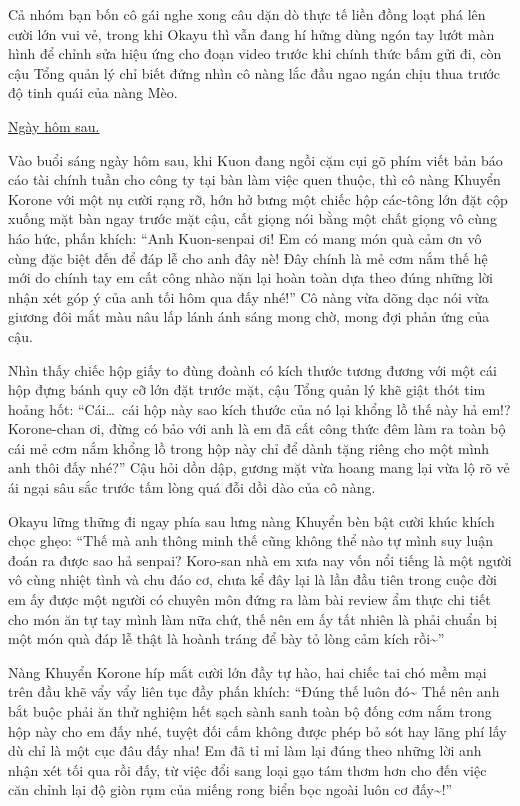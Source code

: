 \documentclass[../main.tex]{subfiles}
\begin{document}
Cả nhóm bạn bốn cô gái nghe xong câu dặn dò thực tế liền đồng loạt phá lên cười lớn vui vẻ, trong khi Okayu thì vẫn đang hí hửng dùng ngón tay lướt màn hình để chỉnh sửa hiệu ứng cho đoạn video trước khi chính thức bấm gửi đi, còn cậu Tổng quản lý chỉ biết đứng nhìn cô nàng lắc đầu ngao ngán chịu thua trước độ tinh quái của nàng Mèo.

\ct

\begin{center}
  \uline{Ngày hôm sau.}
\end{center}

Vào buổi sáng ngày hôm sau, khi Kuon đang ngồi cặm cụi gõ phím viết bản báo cáo tài chính tuần cho công ty tại bàn làm việc quen thuộc, thì cô nàng Khuyển Korone với một nụ cười rạng rỡ, hớn hở bưng một chiếc hộp các-tông lớn đặt cộp xuống mặt bàn ngay trước mặt cậu, cất giọng nói bằng một chất giọng vô cùng háo hức, phấn khích: ``Anh Kuon-senpai ơi! Em có mang món quà cảm ơn vô cùng đặc biệt đến để đáp lễ cho anh đây nè! Đây chính là mẻ cơm nắm thế hệ mới do chính tay em cất công nhào nặn lại hoàn toàn dựa theo đúng những lời nhận xét góp ý của anh tối hôm qua đấy nhé!'' Cô nàng vừa dõng dạc nói vừa giương đôi mắt màu nâu lấp lánh ánh sáng mong chờ, mong đợi phản ứng của cậu.

Nhìn thấy chiếc hộp giấy to đùng đoành có kích thước tương đương với một cái hộp đựng bánh quy cỡ lớn đặt trước mặt, cậu Tổng quản lý khẽ giật thót tim hoảng hốt: ``Cái\dots\ cái hộp này sao kích thước của nó lại khổng lồ thế này hả em!? Korone-chan ơi, đừng có bảo với anh là em đã cất công thức đêm làm ra toàn bộ cái mẻ cơm nắm khổng lồ trong hộp này chỉ để dành tặng riêng cho một mình anh thôi đấy nhé?'' Cậu hỏi dồn dập, gương mặt vừa hoang mang lại vừa lộ rõ vẻ ái ngại sâu sắc trước tấm lòng quá đỗi dồi dào của cô nàng.

Okayu lững thững đi ngay phía sau lưng nàng Khuyển bèn bật cười khúc khích chọc ghẹo: ``Thế mà anh thông minh thế cũng không thể nào tự mình suy luận đoán ra được sao hả senpai? Koro-san nhà em xưa nay vốn nổi tiếng là một người vô cùng nhiệt tình và chu đáo cơ, chưa kể đây lại là lần đầu tiên trong cuộc đời em ấy được một người có chuyên môn đứng ra làm bài review ẩm thực chi tiết cho món ăn tự tay mình làm nữa chứ, thế nên em ấy tất nhiên là phải chuẩn bị một món quà đáp lễ thật là hoành tráng để bày tỏ lòng cảm kích rồi\~{}''

Nàng Khuyển Korone híp mắt cười lớn đầy tự hào, hai chiếc tai chó mềm mại trên đầu khẽ vẩy vẩy liên tục đầy phấn khích: ``Đúng thế luôn đó\~{} Thế nên anh bắt buộc phải ăn thử nghiệm hết sạch sành sanh toàn bộ đống cơm nắm trong hộp này cho em đấy nhé, tuyệt đối cấm không được phép bỏ sót hay lãng phí lấy dù chỉ là một cục đâu đấy nha! Em đã tỉ mỉ làm lại đúng theo những lời anh nhận xét tối qua rồi đấy, từ việc đổi sang loại gạo tám thơm hơn cho đến việc căn chỉnh lại độ giòn rụm của miếng rong biển bọc ngoài luôn cơ đấy\~{}!''
\end{document}
